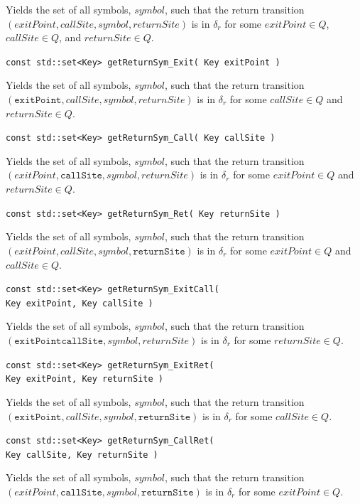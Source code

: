 \documentclass{llncs}
\begin{document}
\begin{description}
    Yields the set of all symbols, $symbol$, such that the return transition
    $(exitPoint,callSite,symbol,returnSite)$ is in $\delta_r$ for some
    $exitPoint \in Q$, $callSite \in Q$, and $returnSite \in Q$.

  \item\texttt{const std::set<Key> getReturnSym\_Exit( Key exitPoint )} \nopagebreak

    Yields the set of all symbols, $symbol$, such that the return transition
    $(\texttt{exitPoint},callSite,symbol,returnSite)$ is in $\delta_r$ for
    some $callSite \in Q$ and $returnSite \in Q$.

  \item\texttt{const std::set<Key> getReturnSym\_Call( Key callSite )} \nopagebreak

    Yields the set of all symbols, $symbol$, such that the return transition
    $(exitPoint,\texttt{callSite},symbol,returnSite)$ is in $\delta_r$ for
    some $exitPoint \in Q$ and $returnSite \in Q$.

  \item\texttt{const std::set<Key> getReturnSym\_Ret( Key returnSite )} \nopagebreak

    Yields the set of all symbols, $symbol$, such that the return transition
    $(exitPoint,callSite,symbol,\texttt{returnSite})$ is in $\delta_r$ for
    some $exitPoint \in Q$ and $callSite \in Q$.

  \item\texttt{const std::set<Key> getReturnSym\_ExitCall( \\ \hspace*{3.25cm} Key exitPoint, Key callSite )} \nopagebreak

    Yields the set of all symbols, $symbol$, such that the return transition
    $(\texttt{exitPoint}\texttt{callSite},symbol,returnSite)$ is in
    $\delta_r$ for some $returnSite \in Q$.

  \item\texttt{const std::set<Key> getReturnSym\_ExitRet( \\ \hspace*{3.25cm} Key exitPoint, Key returnSite )} \nopagebreak

    Yields the set of all symbols, $symbol$, such that the return transition
    $(\texttt{exitPoint},callSite,symbol,\texttt{returnSite})$ is in
    $\delta_r$ for some $callSite \in Q$.

  \item\texttt{const std::set<Key> getReturnSym\_CallRet( \\ \hspace*{3.25cm} Key callSite, Key returnSite )} \nopagebreak

    Yields the set of all symbols, $symbol$, such that the return transition
    $(exitPoint,\texttt{callSite},symbol,\texttt{returnSite})$ is in
    $\delta_r$ for some $exitPoint \in Q$. \\

\end{description}
\end{document}
